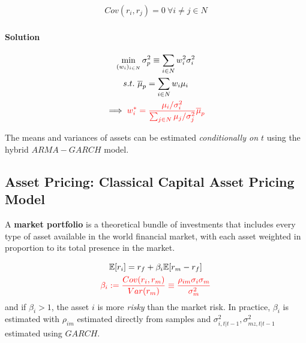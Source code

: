 \documentclass[11pt]{article}
\begin{document}
			\begin{assumption}
				\begin{gather}
					Cov(r_i, r_j) = 0\ \forall i \neq j \in N
				\end{gather}
			\end{assumption}
			
			\paragraph{Solution}
			\begin{gather}
				\min_{(w_i)_{i \in N}} \sigma_p^2 \equiv \sum_{i \in N} w_i^2 \sigma_i^2 \\
				s.t.\ \overline{\mu}_p = \sum_{i \in N} w_i \mu_i \\
				\implies \textcolor{red}{w_i^* = \frac{
					\mu_i/\sigma_i^2
				}{
					\sum_{j \in N} \mu_j/\sigma_j^2
				}\overline{\mu}_p}
			\end{gather}
			
			\begin{remark}
				The means and variances of assets can be estimated \emph{conditionally on $t$} using the hybrid $ARMA-GARCH$ model.
			\end{remark}
		
		\subsection{Asset Pricing: Classical Capital Asset Pricing Model}
			\begin{definition}
				A \textbf{market portfolio} is a theoretical bundle of investments that includes every type of asset available in the world financial market, with each asset weighted in proportion to its total presence in the market.
			\end{definition}
			
			\begin{proposition}
				\begin{gather}
					\mathbb{E}[{r_i}] = r_f + \beta_i \mathbb{E}[{r_m - r_f}] \\
					\textcolor{red}{\beta_i := \frac{Cov(r_i, r_m)}{Var(r_m)} \equiv \frac{\rho_{im}\sigma_i \sigma_m}{\sigma_m^2}}
				\end{gather}
				and if $\beta_i > 1$, the asset $i$ is more \emph{risky} than the market risk. In practice, $\beta_i$ is estimated with $\rho_{im}$ estimated directly from samples and $\sigma^2_{i, t|t-1}, \sigma^2_{mz, t|t-1}$ estimated using $GARCH$.
			\end{proposition}
	
\end{document}
